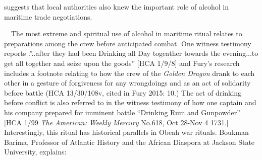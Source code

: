 \begin{styleStandard}
suggests that local authorities also knew the important role of alcohol in maritime trade negotiations. 
\end{styleStandard}


\begin{styleStandard}
\ \ The most extreme and spiritual use of alcohol in maritime ritual relates to preparations among the crew before anticipated combat. One witness testimony reports .”..after they had been Drinking all Day togeather towards the evening...to get all together and seize upon the goods” [HCA 1/9/8] and Fury’s research includes a footnote relating to how the crew of the \textit{Golden Dragon} drank to each other in a gesture of forgiveness for any wrongdoings and as an act of solidarity before battle (HCA 13/30/108v, cited in Fury 2015: 10.) The act of drinking before conflict is also referred to in the witness testimony of how one captain and his company prepared for imminent battle “Drinking Rum and Gunpowder” [HCA 1/99 \textit{The American: Weekly Mercury} No.618, Oct 28-Nov 4 1731.] Interestingly, this ritual has historical parallels in Obeah war rituals. Boukman Barima, Professor of Atlantic History and the African Diaspora at Jackson State University, explains:
\end{styleStandard}


